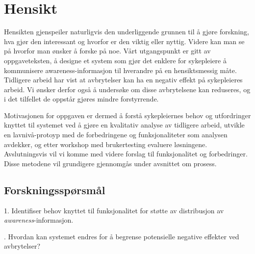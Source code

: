 \section{Hensikt}
\label{chp: hensikt}

Hensikten gjenspeiler naturligvis den underliggende grunnen til å gjøre forskning, hva gjør den interessant og hvorfor er den viktig eller nyttig. Videre kan man se på hvorfor man ønsker å forske på noe. Vårt utgangspunkt er gitt av oppgaveteksten, å designe et system som gjør det enklere for sykepleiere å kommunisere awareness-informasjon til hverandre på en hensiktsmessig måte. Tidligere arbeid har vist at avbrytelser kan ha en negativ effekt på sykepleieres arbeid. Vi ønsker derfor også å undersøke om disse avbrytelsene kan reduseres, og i det tilfellet de oppstår gjøres mindre forstyrrende. 

\noindent
Motivasjonen for oppgaven er dermed å forstå sykepleiernes behov og utfordringer knyttet til systemet ved å gjøre en kvalitativ analyse av tidligere arbeid, utvikle en lavnivå-protoyp med de forbedringene og funksjonaliteter som analysen avdekker, og etter workshop med brukertesting evaluere løsningene. Avslutningsvis vil vi komme med videre forslag til funksjonalitet og forbedringer. Disse metodene vil grundigere gjennomgås under avsnittet om prosess. 

\subsection{Forskningsspørsmål}
1. Identifiser behov knyttet til funksjonalitet for støtte av distribusjon av \emph{awareness}-informasjon.

. Hvordan kan systemet endres for å begrense potensielle negative effekter ved avbrytelser?
